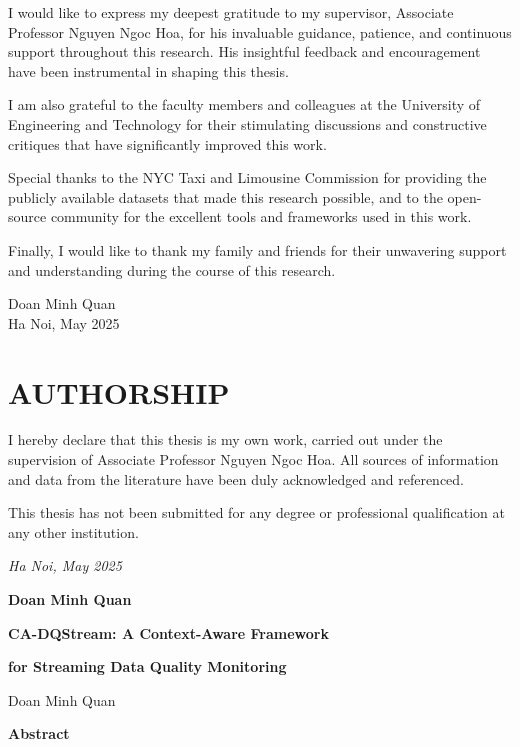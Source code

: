 \documentclass[a4paper, reqno, oneside]{book}
\begin{document}
I would like to express my deepest gratitude to my supervisor, Associate Professor Nguyen Ngoc Hoa, for his invaluable guidance, patience, and continuous support throughout this research. His insightful feedback and encouragement have been instrumental in shaping this thesis.

I am also grateful to the faculty members and colleagues at the University of Engineering and Technology for their stimulating discussions and constructive critiques that have significantly improved this work.

Special thanks to the NYC Taxi and Limousine Commission for providing the publicly available datasets that made this research possible, and to the open-source community for the excellent tools and frameworks used in this work.

Finally, I would like to thank my family and friends for their unwavering support and understanding during the course of this research.

\vspace{2cm}
\begin{flushright}
Doan Minh Quan\\
Ha Noi, May 2025
\end{flushright}


\newpage
\chapter*{AUTHORSHIP}
\vspace{20pt}

I hereby declare that this thesis is my own work, carried out under the supervision of Associate Professor Nguyen Ngoc Hoa. All sources of information and data from the literature have been duly acknowledged and referenced.

This thesis has not been submitted for any degree or professional qualification at any other institution.


\vspace{2cm}
\begin{flushright}
{\it Ha Noi, May 2025}

{\bf Doan Minh Quan}
\end{flushright}

\newpage
\centerline{\bf CA-DQStream: A Context-Aware Framework}
\centerline{\bf for Streaming Data Quality Monitoring}
\vspace{10pt}
\centerline{Doan Minh Quan}

\vspace{2cm}
{\bf Abstract}
\end{document}
